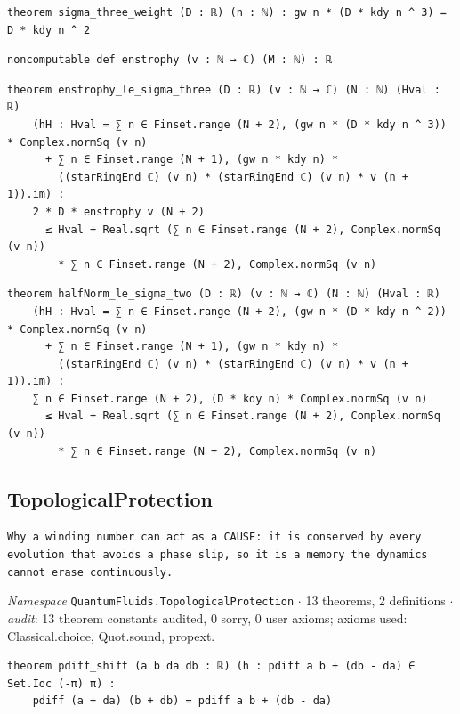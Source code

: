 \begin{lstlisting}[style=leancat]
theorem sigma_three_weight (D : ℝ) (n : ℕ) : gw n * (D * kdy n ^ 3) = D * kdy n ^ 2
\end{lstlisting}

\begin{lstlisting}[style=leancat]
noncomputable def enstrophy (v : ℕ → ℂ) (M : ℕ) : ℝ
\end{lstlisting}

\begin{lstlisting}[style=leancat]
theorem enstrophy_le_sigma_three (D : ℝ) (v : ℕ → ℂ) (N : ℕ) (Hval : ℝ)
    (hH : Hval = ∑ n ∈ Finset.range (N + 2), (gw n * (D * kdy n ^ 3)) * Complex.normSq (v n)
      + ∑ n ∈ Finset.range (N + 1), (gw n * kdy n) *
        ((starRingEnd ℂ) (v n) * (starRingEnd ℂ) (v n) * v (n + 1)).im) :
    2 * D * enstrophy v (N + 2)
      ≤ Hval + Real.sqrt (∑ n ∈ Finset.range (N + 2), Complex.normSq (v n))
        * ∑ n ∈ Finset.range (N + 2), Complex.normSq (v n)
\end{lstlisting}

\begin{lstlisting}[style=leancat]
theorem halfNorm_le_sigma_two (D : ℝ) (v : ℕ → ℂ) (N : ℕ) (Hval : ℝ)
    (hH : Hval = ∑ n ∈ Finset.range (N + 2), (gw n * (D * kdy n ^ 2)) * Complex.normSq (v n)
      + ∑ n ∈ Finset.range (N + 1), (gw n * kdy n) *
        ((starRingEnd ℂ) (v n) * (starRingEnd ℂ) (v n) * v (n + 1)).im) :
    ∑ n ∈ Finset.range (N + 2), (D * kdy n) * Complex.normSq (v n)
      ≤ Hval + Real.sqrt (∑ n ∈ Finset.range (N + 2), Complex.normSq (v n))
        * ∑ n ∈ Finset.range (N + 2), Complex.normSq (v n)
\end{lstlisting}

\subsection{TopologicalProtection}\label{appA:TopologicalProtection}
{\footnotesize\raggedright\texttt{Why a winding number can act as a CAUSE: it is conserved by every evolution that avoids a phase slip,\allowbreak{} so it is a memory the dynamics cannot erase continuously.\allowbreak{}}\par}
{\footnotesize\raggedright\emph{Namespace} \texttt{QuantumFluids.\allowbreak{}TopologicalProtection} $\cdot$ 13 theorems, 2 definitions $\cdot$ \emph{audit}: 13 theorem constants audited, 0 sorry, 0 user axioms; axioms used: Classical.choice, Quot.sound, propext.\par}
\vspace{1pt}
\begin{lstlisting}[style=leancat]
theorem pdiff_shift (a b da db : ℝ) (h : pdiff a b + (db - da) ∈ Set.Ioc (-π) π) :
    pdiff (a + da) (b + db) = pdiff a b + (db - da)
\end{lstlisting}

